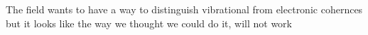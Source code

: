 The field wants to have a way to distinguish vibrational from electronic cohernces but it looks like the way we thought we could do it, will not work
